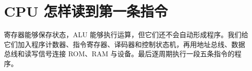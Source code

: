 \chapter{CPU 怎样读到第一条指令}

寄存器能够保存状态，ALU 能够执行运算，但它们还不会自动形成程序。我们给
它们加入程序计数器、指令寄存器、译码器和控制状态机，再用地址总线、数据
总线和读写信号连接 ROM、RAM 与设备。最后逐周期执行一段五条指令的程序。




